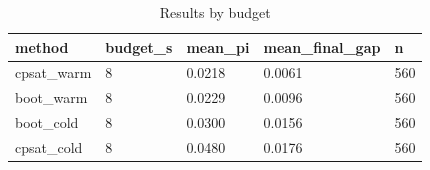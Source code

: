 \begin{table}[t]
\centering
\begin{tabular}{lllll}
\toprule
method & budget\_s & mean\_pi & mean\_final\_gap & n \\
\midrule
cpsat\_warm & 8 & 0.0218 & 0.0061 & 560 \\
boot\_warm & 8 & 0.0229 & 0.0096 & 560 \\
boot\_cold & 8 & 0.0300 & 0.0156 & 560 \\
cpsat\_cold & 8 & 0.0480 & 0.0176 & 560 \\
\bottomrule
\end{tabular}
\caption{Results by budget}
\label{tab:by-budget}
\end{table}
